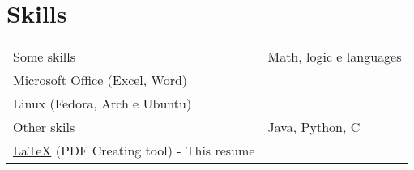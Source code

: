 \documentclass[a4paper,12pt]{article}
\begin{document}
\section{Skills}
\begin{tabularx}{\linewidth}{@{}l X@{}}
Some skills &  \normalsize{Math, logic e languages}\\
\normalsize{Microsoft Office (Excel, Word)}\\ 
\normalsize{Linux (Fedora, Arch e Ubuntu)}  \\
Other skils  &  \normalsize{ Java, Python, C}\\ 
\href{https://www.latex-project.org/}{\LaTeX} (PDF Creating tool) - This resume
\end{tabularx}

\vfill
{}
\end{document}
